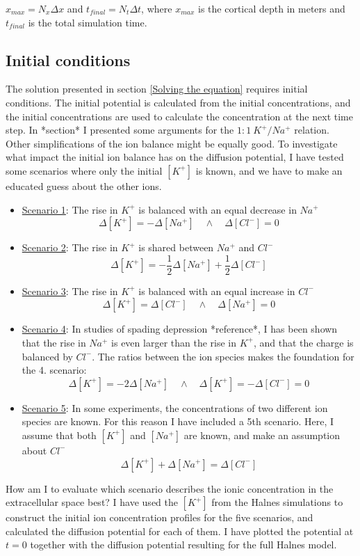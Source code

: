 \documentclass{article}
\begin{document}
$x_{max} =N_x \Delta x$ and $t_{final} = N_t \Delta t$, where $x_{max}$ is the cortical depth in meters and $t_{final}$ is the total simulation time.
\subsection{Initial conditions}\label{Initial conditions: Ion concentration profiles from experiments}
The solution presented in section \ref{Solving the equation} requires initial conditions. The initial potential is calculated from the initial concentrations, and the initial concentrations are used to calculate the concentration at the next time step. In *section* I presented some arguments for the $1\!:\!1\ K^+\!/Na^+$ relation. Other simplifications of the ion balance might be equally good. To investigate what impact the initial ion balance has on the diffusion potential, I have tested some scenarios where only the initial $[K^+]$ is known, and we have to make an educated guess about the other ions.
\begin{itemize}
	\item[]\underline{Scenario 1}: The rise in $K^+$ is balanced with an equal decrease in $Na^+$
	  $$\Delta [K^+] = -\Delta [Na^+] \quad \land \quad \Delta [Cl^-] =0$$
	\item[]\underline{Scenario 2}:  The rise in $K^+$ is shared between $Na^+$ and $Cl^-$
	$$\Delta [K^+] = -\frac{1}{2} \Delta [Na^+] +\frac{1}{2} \Delta [Cl^-] $$ 
		\item[]\underline{Scenario 3}:  The rise in $K^+$ is balanced with an equal increase in $Cl^-$
	  $$\Delta [K^+] = \Delta [Cl^-] \quad \land \quad \Delta [Na^+] =0$$
	  \item[]\underline{Scenario 4}:  In studies of spading depression *reference*, I has been shown that the rise in $Na^+$ is even larger than the rise in $K^+$, and that the charge is balanced by $Cl^-$. The ratios between the ion species makes the foundation for the 4. scenario:
	$$\Delta [K^+] = -2 \Delta [Na^+] \quad \land \quad \Delta [K^+] =  -\Delta [Cl^-] =0$$ 
	\item[]\underline{Scenario 5}: In some experiments, the concentrations of two different ion species are known. For this reason I have included a 5th scenario. Here, I assume that both $[K^+]$ and $[Na^+]$ are known, and make an assumption about $Cl^-$
	$$\Delta [K^+] + \Delta [Na^+] = \Delta[Cl^-] $$
\end{itemize}

How am I to evaluate which scenario describes the ionic concentration in the extracellular space best? I have used the $[K^+]$ from the Halnes simulations to construct the initial ion concentration profiles for the five scenarios, and calculated the diffusion potential for each of them. I have plotted the potential at $t=0$ together with the diffusion potential resulting for the full Halnes model. 
\end{document}
